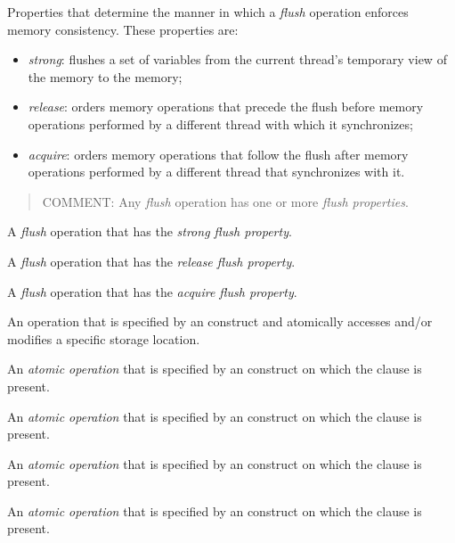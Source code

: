 \glossarydefstart
Properties that determine the manner in which a \emph{flush} operation enforces
memory consistency. These properties are:
\begin{itemize}
    \item \emph{strong}: flushes a set of variables from the current thread's
        temporary view of the memory to the memory;
    \item \emph{release}: orders memory operations that precede the flush
        before memory operations performed by a different thread with which it
        synchronizes;
    \item \emph{acquire}: orders memory operations that follow the flush after
        memory operations performed by a different thread that synchronizes
        with it.
\end{itemize}

\begin{quote}
COMMENT: Any \emph{flush} operation has one or more \emph{flush properties}.
\end{quote}
\glossarydefend

\glossarydefstart
A \emph{flush} operation that has the \emph{strong flush property}.
\glossarydefend

\glossarydefstart
A \emph{flush} operation that has the \emph{release flush property}.
\glossarydefend

\glossarydefstart
A \emph{flush} operation that has the \emph{acquire flush property}.
\glossarydefend

\glossarydefstart
An operation that is specified by an  construct and atomically
accesses and/or modifies a specific storage location.
\glossarydefend

\glossarydefstart
An \emph{atomic operation} that is specified by an  construct 
on which the  clause is present.
\glossarydefend

\glossarydefstart
An \emph{atomic operation} that is specified by an  construct 
on which the  clause is present.
\glossarydefend

\glossarydefstart
An \emph{atomic operation} that is specified by an  construct 
on which the  clause is present.
\glossarydefend

\glossarydefstart
An \emph{atomic operation} that is specified by an  construct 
on which the  clause is present.
\glossarydefend

